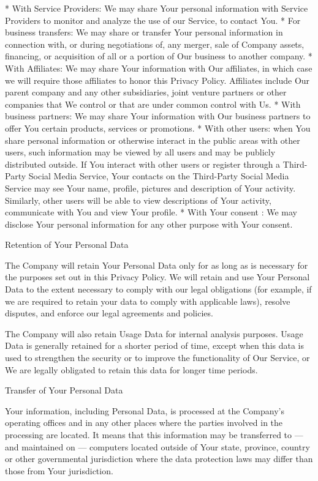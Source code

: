   * With Service Providers: We may share Your personal information with
    Service Providers to monitor and analyze the use of our Service, to
    contact You.
  * For business transfers: We may share or transfer Your personal information
    in connection with, or during negotiations of, any merger, sale of Company
    assets, financing, or acquisition of all or a portion of Our business to
    another company.
  * With Affiliates: We may share Your information with Our affiliates, in
    which case we will require those affiliates to honor this Privacy Policy.
    Affiliates include Our parent company and any other subsidiaries, joint
    venture partners or other companies that We control or that are under
    common control with Us.
  * With business partners: We may share Your information with Our business
    partners to offer You certain products, services or promotions.
  * With other users: when You share personal information or otherwise
    interact in the public areas with other users, such information may be
    viewed by all users and may be publicly distributed outside. If You
    interact with other users or register through a Third-Party Social Media
    Service, Your contacts on the Third-Party Social Media Service may see
    Your name, profile, pictures and description of Your activity. Similarly,
    other users will be able to view descriptions of Your activity,
    communicate with You and view Your profile.
  * With Your consent : We may disclose Your personal information for any
    other purpose with Your consent.

Retention of Your Personal Data  
~~~~~~~~~~~~~~~~~~~~~~~~~~~~~~~

The Company will retain Your Personal Data only for as long as is necessary
for the purposes set out in this Privacy Policy. We will retain and use Your
Personal Data to the extent necessary to comply with our legal obligations
(for example, if we are required to retain your data to comply with applicable
laws), resolve disputes, and enforce our legal agreements and policies.

The Company will also retain Usage Data for internal analysis purposes. Usage
Data is generally retained for a shorter period of time, except when this data
is used to strengthen the security or to improve the functionality of Our
Service, or We are legally obligated to retain this data for longer time
periods.

Transfer of Your Personal Data  
~~~~~~~~~~~~~~~~~~~~~~~~~~~~~~

Your information, including Personal Data, is processed at the Company's
operating offices and in any other places where the parties involved in the
processing are located. It means that this information may be transferred to —
and maintained on — computers located outside of Your state, province, country
or other governmental jurisdiction where the data protection laws may differ
than those from Your jurisdiction.

